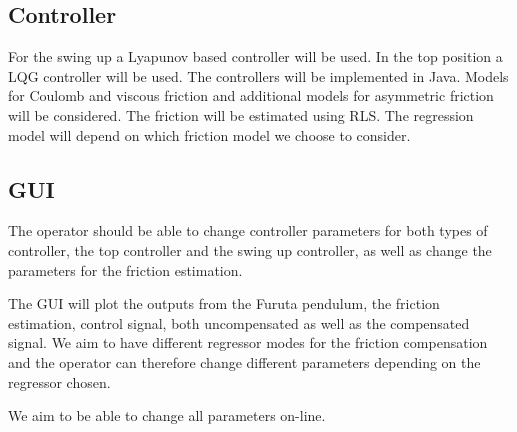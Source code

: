\documentclass[10pt,a4paper]{article}
\begin{document}




\subsection{Controller}
For the swing up a Lyapunov based controller will be used. In the top position a LQG controller will be used. The controllers will be implemented in Java.
Models for Coulomb and viscous friction and additional models for asymmetric friction will be considered. The friction will be estimated using RLS. The regression model will depend on which friction model we choose to consider. 

\subsection{GUI}
The operator should be able to change controller parameters for both types of controller, the top controller and the swing up controller, as well as change the parameters for the friction estimation. 

The GUI will plot the outputs from the Furuta pendulum, the friction estimation, control signal, both uncompensated as well as the compensated signal. We aim to have different regressor modes for the friction compensation and the operator can therefore change different parameters depending on the regressor chosen. 

We aim to be able to change all parameters on-line.
\end{document}
